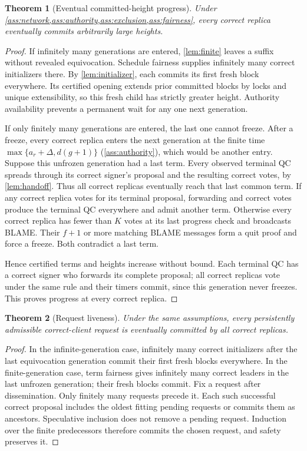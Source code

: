 \documentclass[11pt,a4paper]{article}
\newtheorem{theorem}[theorem]{Theorem}
\begin{document}
\begin{theorem}[Eventual committed-height progress]
\label{thm:height}
Under \cref{ass:network,ass:authority,ass:exclusion,ass:fairness}, every
correct replica eventually commits arbitrarily large heights.
\end{theorem}
\begin{proof}
If infinitely many generations are entered, \cref{lem:finite} leaves a
suffix without revealed equivocation. Schedule fairness supplies infinitely
many correct initializers there. By \cref{lem:initializer}, each commits
its first fresh block everywhere. Its certified opening extends prior
committed blocks by locks and unique extensibility, so this fresh child
has strictly greater height. Authority availability prevents a permanent
wait for any one next generation.

If only finitely many generations are entered, the last one cannot freeze.
After a freeze, every correct replica enters the next generation at
the finite time $\max\{a_r+\Delta,d(g+1)\}$ (\cref{ass:authority}), which
would be another entry.
Suppose this unfrozen generation had a last term. Every observed
terminal QC spreads through its correct signer's proposal and the
resulting correct votes, by \cref{lem:handoff}. Thus all correct replicas
eventually reach that last common term. If any correct replica votes for
its terminal proposal, forwarding and correct votes produce the terminal
QC everywhere and admit another term. Otherwise every correct replica has
fewer than $K$ votes at its last progress check and broadcasts BLAME.
Their $f+1$ or more matching BLAME messages form a quit proof and
force a freeze. Both contradict a last term.

Hence certified terms and heights increase without bound. Each terminal
QC has a correct signer who forwards its complete proposal; all correct
replicas vote under the same rule and their timers commit, since this
generation never freezes. This proves progress at every correct replica.
\end{proof}

\begin{theorem}[Request liveness]
\label{thm:requests}
Under the same assumptions, every persistently admissible correct-client
request is eventually committed by all correct replicas.
\end{theorem}
\begin{proof}
In the infinite-generation case, infinitely many correct initializers
after the last equivocation generation commit their first fresh blocks
everywhere. In the finite-generation case, term fairness gives infinitely
many correct leaders in the last unfrozen generation; their fresh blocks
commit. Fix a request after dissemination. Only finitely many requests
precede it. Each such successful correct proposal includes the oldest
fitting pending requests or commits them as ancestors. Speculative
inclusion does not remove a pending request. Induction over the finite
predecessors therefore commits the chosen request, and safety preserves it.
\end{proof}
\end{document}
